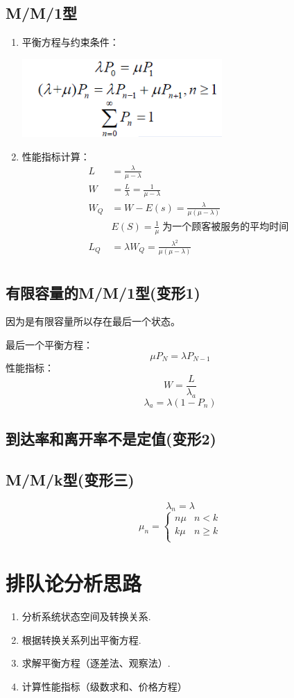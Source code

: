\documentclass[12pt,a4paper]{article}
\begin{document}
\subsection{M/M/1型}
\begin{enumerate}
  \item 平衡方程与约束条件：
  \begin{center}
    \includegraphics[width  = 0.6\textwidth]{figures/MM1}
  \end{center}
  \item 性能指标计算：
  \begin{equation*}
    \begin{split}
      L & = \frac{\lambda}{\mu - \lambda}\\
      W & = \frac{L}{\lambda} = \frac{1}{\mu - \lambda}\\
      W_Q & = W - E(s) = \frac{\lambda}{\mu(\mu - \lambda)}\\
      & E(S) = \frac{1}{\mu}\;\text{为一个顾客被服务的平均时间}\\
      L_Q & = \lambda W_Q = \frac{\lambda^2}{\mu(\mu - \lambda)}\\
    \end{split}
  \end{equation*}
\end{enumerate}

\subsection{有限容量的M/M/1型(变形1)}
因为是有限容量所以存在最后一个状态。

最后一个平衡方程：
$$\mu P_N = \lambda P_{N - 1}$$
性能指标：
$$W = \frac{L}{\lambda_a}$$
$$\lambda_a = \lambda(1 - P_n)$$
\subsection{到达率和离开率不是定值(变形2)}
\subsection{M/M/k型(变形三)}
$$\lambda_n = \lambda$$
\begin{equation*}
  \mu_n =
  \begin{cases}
    n\mu & n < k\\
    k\mu & n \ge k\\
  \end{cases}
\end{equation*}

\section{排队论分析思路}
\begin{enumerate}
  \item 分析系统状态空间及转换关系.
  \item 根据转换关系列出平衡方程.
  \item 求解平衡方程（逐差法、观察法）.
  \item 计算性能指标（级数求和、价格方程）
\end{enumerate}
\end{document}
